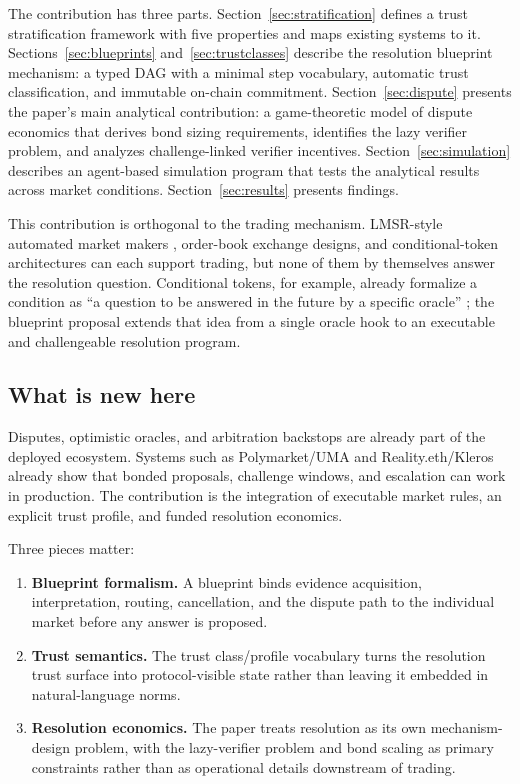 \documentclass[10pt]{article}
\begin{document}
The contribution has three parts. Section~\ref{sec:stratification} defines a trust stratification framework with five properties and maps existing systems to it. Sections~\ref{sec:blueprints} and~\ref{sec:trustclasses} describe the resolution blueprint mechanism: a typed DAG with a minimal step vocabulary, automatic trust classification, and immutable on-chain commitment. Section~\ref{sec:dispute} presents the paper's main analytical contribution: a game-theoretic model of dispute economics that derives bond sizing requirements, identifies the lazy verifier problem, and analyzes challenge-linked verifier incentives. Section~\ref{sec:simulation} describes an agent-based simulation program that tests the analytical results across market conditions. Section~\ref{sec:results} presents findings.

This contribution is orthogonal to the trading mechanism. LMSR-style automated market makers \cite{hanson2002}, order-book exchange designs, and conditional-token architectures can each support trading, but none of them by themselves answer the resolution question. Conditional tokens, for example, already formalize a condition as ``a question to be answered in the future by a specific oracle'' \cite{gnosisct2026}; the blueprint proposal extends that idea from a single oracle hook to an executable and challengeable resolution program.

\subsection{What is new here}

Disputes, optimistic oracles, and arbitration backstops are already part of the deployed ecosystem. Systems such as Polymarket/UMA and Reality.eth/Kleros already show that bonded proposals, challenge windows, and escalation can work in production. The contribution is the integration of executable market rules, an explicit trust profile, and funded resolution economics.

Three pieces matter:
\begin{enumerate}
\item \textbf{Blueprint formalism.} A blueprint binds evidence acquisition, interpretation, routing, cancellation, and the dispute path to the individual market before any answer is proposed.
\item \textbf{Trust semantics.} The trust class/profile vocabulary turns the resolution trust surface into protocol-visible state rather than leaving it embedded in natural-language norms.
\item \textbf{Resolution economics.} The paper treats resolution as its own mechanism-design problem, with the lazy-verifier problem and bond scaling as primary constraints rather than as operational details downstream of trading.
\end{enumerate}
\end{document}

